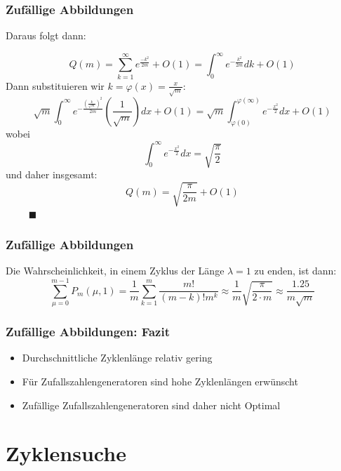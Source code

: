 \documentclass{beamer}
\begin{document}

\begin{frame}
	\frametitle{Zufällige Abbildungen}

	Daraus folgt dann:

	\[
		Q(m)= \sum_{k=1}^{\infty} e^{\frac{-k^2}{2m}} + O(1)
		= \int_0^{\infty} e^{-\frac{k^2}{2m}} dk + O(1)
	\]
	Dann substituieren wir \(k=\varphi(x)=\frac{x}{\sqrt{m}}\):
	\[
		\sqrt{m} \int_{0}^{\infty} e^{-\frac{\left(\frac{k}{\sqrt{m}}\right)^2}{2m} }\left(\frac{1}{\sqrt{m}}\right) dx + O(1)
		= \sqrt{m} \int_{\varphi(0)}^{\varphi(\infty)} e^{-\frac{x^2}{2}} dx + O(1)
	\]
	wobei
	\[
		\int_0^{\infty} e^{-\frac{x^2}{2}} dx = \sqrt{\frac{\pi}{2}}
	\]
	und daher insgesamt:
	\[
		Q(m) = \sqrt{\frac{\pi}{2m}} + O(1)
	\]
	\(\qquad\) \hfill \(\blacksquare\) \\
\end{frame}


\begin{frame}
	\frametitle{Zufällige Abbildungen}
	Die Wahrscheinlichkeit, in einem Zyklus der Länge \(\lambda=1\) zu enden, ist dann:
	\[
		\sum_{\mu=0}^{m-1} P_m(\mu,1) = \frac{1}{m} \sum_{k=1}^{m} \frac{m!}{(m-k)! m^k} \approx \frac{1}{m} \sqrt{\frac{\pi}{2 \cdot m}} \approx \frac{1.25}{m\sqrt{m}}
	\]
\end{frame}


\begin{frame}
	\frametitle{Zufällige Abbildungen: Fazit}
	\begin{itemize}
		\item Durchschnittliche Zyklenlänge relativ gering
		\item Für Zufallszahlengeneratoren sind hohe Zyklenlängen erwünscht
		\item Zufällige Zufallszahlengeneratoren sind daher nicht Optimal
	\end{itemize}
\end{frame}


\section{Zyklensuche}

\end{document}
